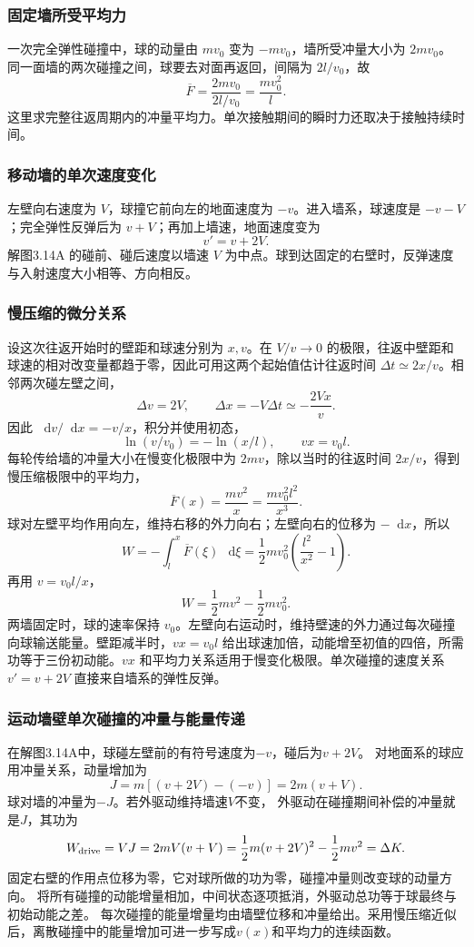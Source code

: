 \documentclass[UTF8,fontset=fandol,a4paper,11pt]{ctexart}
\newcommand{\dd}{\mathop{}\!\mathrm{d}}
\begin{document}
\subsubsection*{固定墙所受平均力}
一次完全弹性碰撞中，球的动量由 $mv_0$ 变为 $-mv_0$，墙所受冲量大小为 $2mv_0$。
同一面墙的两次碰撞之间，球要去对面再返回，间隔为 $2l/v_0$，故
\[
\boxed{\overline F=\frac{2mv_0}{2l/v_0}=\frac{mv_0^2}{l}}.
\]
这里求完整往返周期内的冲量平均力。单次接触期间的瞬时力还取决于接触持续时间。

\subsubsection*{移动墙的单次速度变化}
左壁向右速度为 $V$，球撞它前向左的地面速度为 $-v$。进入墙系，球速度是 $-v-V$；完全弹性反弹后为 $v+V$；再加上墙速，地面速度变为
\[
v'=v+2V.
\]
解图3.14A 的碰前、碰后速度以墙速 $V$ 为中点。球到达固定的右壁时，反弹速度与入射速度大小相等、方向相反。

\subsubsection*{慢压缩的微分关系}
设这次往返开始时的壁距和球速分别为 $x,v$。在 $V/v\to0$ 的极限，往返中壁距和球速的相对改变量都趋于零，因此可用这两个起始值估计往返时间 $\Delta t\simeq2x/v$。相邻两次碰左壁之间，
\[
\Delta v=2V,\qquad \Delta x=-V\Delta t\simeq-\frac{2Vx}{v}.
\]
因此 $\dd v/\dd x=-v/x$，积分并使用初态，
\[
\ln(v/v_0)=-\ln(x/l),\qquad
\boxed{vx=v_0l}.
\]
每轮传给墙的冲量大小在慢变化极限中为 $2mv$，除以当时的往返时间 $2x/v$，得到慢压缩极限中的平均力，
\[
\overline F(x)=\frac{mv^2}{x}
=\frac{mv_0^2l^2}{x^3}.
\]
球对左壁平均作用向左，维持右移的外力向右；左壁向右的位移为 $-\dd x$，所以
\[
W=-\int_l^x\overline F(\xi)\,\dd\xi
=\frac12mv_0^2\left(\frac{l^2}{x^2}-1\right).
\]
再用 $v=v_0l/x$，
\[
\boxed{W=\frac12mv^2-\frac12mv_0^2}.
\]
两墙固定时，球的速率保持 $v_0$。左壁向右运动时，维持壁速的外力通过每次碰撞向球输送能量。壁距减半时，$vx=v_0l$ 给出球速加倍，动能增至初值的四倍，所需功等于三份初动能。$vx$ 和平均力关系适用于慢变化极限。单次碰撞的速度关系 $v'=v+2V$ 直接来自墙系的弹性反弹。
\subsubsection*{运动墙壁单次碰撞的冲量与能量传递}
在解图3.14A中，球碰左壁前的有符号速度为$-v$，碰后为$v+2V$。
对地面系的球应用冲量关系，动量增加为
\[
J=m[(v+2V)-(-v)]=2m(v+V).
\]
球对墙的冲量为$-J$。若外驱动维持墙速$V$不变，
外驱动在碰撞期间补偿的冲量就是$J$，其功为
\[
W_{\rm drive}=VJ=2mV(v+V)
=\frac12m(v+2V)^2-\frac12mv^2=\Delta K.
\]
固定右壁的作用点位移为零，它对球所做的功为零，碰撞冲量则改变球的动量方向。
将所有碰撞的动能增量相加，中间状态逐项抵消，外驱动总功等于球最终与初始动能之差。
每次碰撞的能量增量均由墙壁位移和冲量给出。采用慢压缩近似后，离散碰撞中的能量增加可进一步写成$v(x)$和平均力的连续函数。
\end{document}
